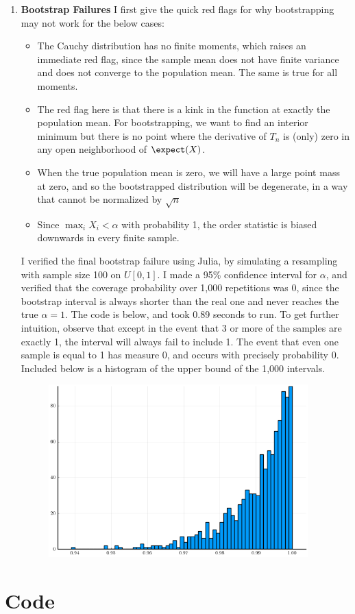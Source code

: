 \documentclass[10pt]{article}
\begin{document}
\begin{enumerate}
	\item \textbf{Bootstrap Failures} I first give the quick red flags for why bootstrapping may not work for the below cases: \begin{itemize}\item The Cauchy distribution has no finite moments, which raises an immediate red flag, since the sample mean does not have finite variance and does not converge to the population mean. The same is true for all moments. \item The red flag here is that there is a kink in the function at exactly the population mean. For bootstrapping, we want to find an interior minimum but there is no point where the derivative of $T_n$ is (only) zero in any open neighborhood of $\expect(X)$. \item When the true population mean is zero, we will have a large point mass at zero, and so the bootstrapped distribution will be degenerate, in a way that cannot be normalized by $\sqrt{n}$ \item Since $\max_i X_i < \alpha$ with probability 1, the order statistic is biased downwards in every finite sample. \end{itemize} I verified the final bootstrap failure using Julia, by simulating a resampling with sample size 100 on $U[0,1]$. I made a 95\% confidence interval for $\alpha$, and verified that the coverage probability over 1,000 repetitions was 0, since the bootstrap interval is always shorter than the real one and never reaches the true $\alpha = 1$. The code is below, and took 0.89 seconds to run. To get further intuition, observe that except in the event that 3 or more of the samples are exactly 1, the interval will always fail to include 1. The event that even one sample is equal to 1 has measure 0, and occurs with precisely probability 0. Included below is a histogram of the upper bound of the 1,000 intervals. \begin{figure}[H] \centering \includegraphics[width=10cm]{ps6_code/ps6_max.png}\end{figure}
\end{enumerate}





\newpage
\section*{Code}\label{code}


\end{document}
